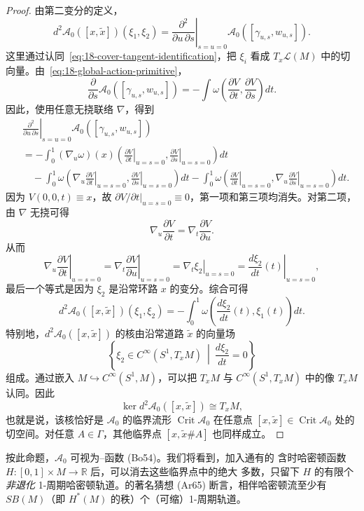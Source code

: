 \begin{proof}
由第二变分的定义，
\[
 d^2\mathcal A_0([x,\widetilde x])(\xi_1,\xi_2)
 =\left.\frac{\partial^2}{\partial u\,\partial s}\right|_{s=u=0}
  \mathcal A_0([\gamma_{u,s},w_{u,s}]).
\]
这里通过认同~\eqref{eq:18-cover-tangent-identification}，把 $\xi_i$ 看成
$T_x\mathcal L(M)$ 中的切向量。由~\eqref{eq:18-global-action-primitive}，
\[
 \frac\partial{\partial s}\mathcal A_0([\gamma_{u,s},w_{u,s}])
 =-\int\omega\left(\frac{\partial V}{\partial t},
                     \frac{\partial V}{\partial s}\right)dt.
\]
因此，使用任意无挠联络 $\nabla$，得到
\begin{align*}
 &\left.\frac{\partial^2}{\partial u\,\partial s}\right|_{s=u=0}
 \mathcal A_0([\gamma_{u,s},w_{u,s}])\\
 &=-\int_0^1(\nabla_u\omega)(x)
   \left(\left.\frac{\partial V}{\partial t}\right|_{u=s=0},
         \left.\frac{\partial V}{\partial s}\right|_{u=s=0}\right)dt\\
 &\quad-\int_0^1\omega\left(
   \left.\nabla_u\frac{\partial V}{\partial t}\right|_{u=s=0},
   \left.\frac{\partial V}{\partial s}\right|_{u=s=0}\right)dt
 -\int_0^1\omega\left(
   \left.\frac{\partial V}{\partial t}\right|_{u=s=0},
   \left.\nabla_u\frac{\partial V}{\partial s}\right|_{u=s=0}\right)dt.
\end{align*}
因为 $V(0,0,t)\equiv x$，故
$\left.\partial V/\partial t\right|_{u=s=0}\equiv0$，第一项和第三项均消失。对第二项，
由 $\nabla$ 无挠可得
\[
 \nabla_u\frac{\partial V}{\partial t}
 =\nabla_t\frac{\partial V}{\partial u}.
\]
从而
\[
 \left.\nabla_u\frac{\partial V}{\partial t}\right|_{u=s=0}
 =\left.\nabla_t\frac{\partial V}{\partial u}\right|_{u=s=0}
 =\left.\nabla_t\xi_2\right|_{u=s=0}
 =\left.\frac{d\xi_2}{dt}(t)\right|_{u=s=0},
\]
最后一个等式是因为 $\xi_2$ 是沿常环路 $x$ 的变分。综合可得
\[
 d^2\mathcal A_0([x,\widetilde x])(\xi_1,\xi_2)
 =-\int_0^1\omega\left(\frac{d\xi_2}{dt}(t),\xi_1(t)\right)dt.
\]
特别地，$d^2\mathcal A_0([x,\widetilde x])$ 的核由沿常道路 $\widetilde x$ 的向量场
\[
 \left\{\xi_2\in C^\infty(S^1,T_xM)\ \middle|\
 \frac{d\xi_2}{dt}=0\right\}
\]
组成。通过嵌入 $M\hookrightarrow C^\infty(S^1,M)$，可以把 $T_xM$ 与
$C^\infty(S^1,T_xM)$ 中的像 $T_xM$ 认同。因此
\[
 \ker d^2\mathcal A_0([x,\widetilde x])\cong T_xM,
\]
也就是说，该核恰好是 $\mathcal A_0$ 的临界流形
$\operatorname{Crit}\mathcal A_0$ 在任意点
$[x,\widetilde x]\in\operatorname{Crit}\mathcal A_0$ 处的切空间。对任意
$A\in\Gamma$，其他临界点 $[x,\widetilde x\#A]$ 也同样成立。
\end{proof}

按此命题，$\mathcal A_0$ 可视为\personBott{}--\personMorse{}函数 (Bo54)。我们将看到，加入通有的
含时哈密顿函数 $H:[0,1]\times M\to\mathbb R$ 后，可以消去这些临界点中的绝大
多数，只留下 $H$ 的有限个\emph{非退化} 1-周期哈密顿轨道。\personArnold{}的著名猜想 (Ar65)
断言，相伴哈密顿流至少有 $SB(M)$（即 $H^*(M)$ 的秩）个（可缩）1-周期轨道。
